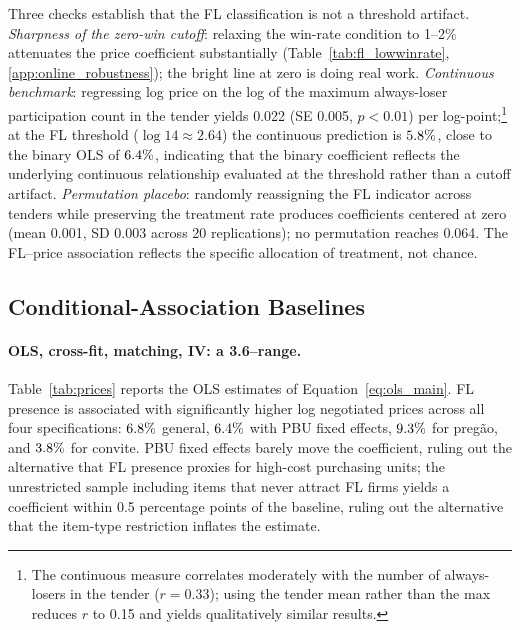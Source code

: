 Three checks establish that the FL classification is not a
threshold artifact. \emph{Sharpness of the zero-win cutoff}: relaxing
the win-rate condition to 1--2\% attenuates the price coefficient
substantially (Table~\ref{tab:fl_lowwinrate},
\ref{app:online_robustness}); the bright line at zero is doing real
work. \emph{Continuous benchmark}: regressing log price on the log
of the maximum always-loser participation count in the tender
yields 0.022 (SE 0.005, $p < 0.01$) per log-point;\footnote{The
continuous measure correlates moderately with the number of
always-losers in the tender ($r = 0.33$); using the tender mean
rather than the max reduces $r$ to 0.15 and yields qualitatively
similar results.} at the FL threshold ($\log 14 \approx 2.64$) the
continuous prediction is $5.8\%$, close to the binary OLS of
$6.4\%$, indicating that the binary coefficient reflects the
underlying continuous relationship evaluated at the threshold
rather than a cutoff artifact. \emph{Permutation placebo}:
randomly reassigning the FL indicator across tenders while
preserving the \valCartelMarkup treatment rate produces coefficients centered
at zero (mean 0.001, SD 0.003 across 20 replications); no
permutation reaches 0.064. The FL--price association reflects the
specific allocation of treatment, not chance.


\subsection{Conditional-Association Baselines}
\label{sec:results_ols}

\paragraph{OLS, cross-fit, matching, IV: a 3.6--\valFLpremBottomReg range.}
Table~\ref{tab:prices} reports the OLS estimates of
Equation~\eqref{eq:ols_main}. FL presence is associated with
significantly higher log negotiated prices across all four
specifications: $6.8\%$ general, $6.4\%$ with PBU fixed effects,
$9.3\%$ for preg\~ao, and $3.8\%$ for convite. PBU fixed effects
barely move the coefficient, ruling out the alternative that FL
presence proxies for high-cost purchasing units; the unrestricted
sample including items that never attract FL firms yields a
coefficient within 0.5 percentage points of the baseline,
ruling out the alternative that the item-type restriction
inflates the estimate.


